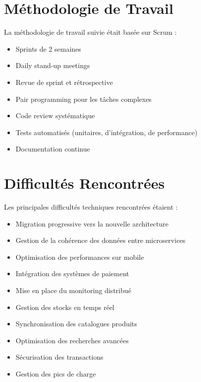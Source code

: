 \section{Méthodologie de Travail}
La méthodologie de travail suivie était basée sur Scrum :
\begin{itemize}
    \item Sprints de 2 semaines
    \item Daily stand-up meetings
    \item Revue de sprint et rétrospective
    \item Pair programming pour les tâches complexes
    \item Code review systématique
    \item Tests automatisés (unitaires, d'intégration, de performance)
    \item Documentation continue
\end{itemize}

\section{Difficultés Rencontrées}
Les principales difficultés techniques rencontrées étaient :
\begin{itemize}
    \item Migration progressive vers la nouvelle architecture
    \item Gestion de la cohérence des données entre microservices
    \item Optimisation des performances sur mobile
    \item Intégration des systèmes de paiement
    \item Mise en place du monitoring distribué
    \item Gestion des stocks en temps réel
    \item Synchronisation des catalogues produits
    \item Optimisation des recherches avancées
    \item Sécurisation des transactions
    \item Gestion des pics de charge
\end{itemize}

